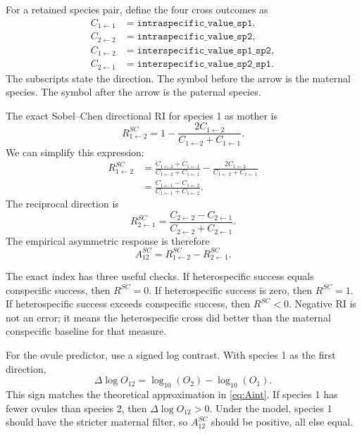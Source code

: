 \documentclass[12pt]{article}
\begin{document}
For a retained species pair, define the four cross outcomes as
\begin{align}
C_{1\leftarrow 1} &= \texttt{intraspecific\_value\_sp1},\\
C_{2\leftarrow 2} &= \texttt{intraspecific\_value\_sp2},\\
C_{1\leftarrow 2} &= \texttt{interspecific\_value\_sp1\_sp2},\\
C_{2\leftarrow 1} &= \texttt{interspecific\_value\_sp2\_sp1}.
\end{align}
The subscripts state the direction. The symbol before the arrow is the maternal species. The symbol after the arrow is the paternal species.

The exact Sobel--Chen directional RI for species 1 as mother is
\begin{equation}
R^{SC}_{1\leftarrow 2}
=1-\frac{2C_{1\leftarrow 2}}{C_{1\leftarrow 2}+C_{1\leftarrow 1}}.
\label{eq:SCdata1}
\end{equation}
We can simplify this expression:
\begin{align}
R^{SC}_{1\leftarrow 2}
&=\frac{C_{1\leftarrow 2}+C_{1\leftarrow 1}}{C_{1\leftarrow 2}+C_{1\leftarrow 1}}
-\frac{2C_{1\leftarrow 2}}{C_{1\leftarrow 2}+C_{1\leftarrow 1}}\\
&=\frac{C_{1\leftarrow 1}-C_{1\leftarrow 2}}{C_{1\leftarrow 1}+C_{1\leftarrow 2}}.
\label{eq:SCdata1simple}
\end{align}
The reciprocal direction is
\begin{equation}
R^{SC}_{2\leftarrow 1}
=\frac{C_{2\leftarrow 2}-C_{2\leftarrow 1}}{C_{2\leftarrow 2}+C_{2\leftarrow 1}}.
\label{eq:SCdata2simple}
\end{equation}
The empirical asymmetric response is therefore
\begin{equation}
A^{SC}_{12}=R^{SC}_{1\leftarrow 2}-R^{SC}_{2\leftarrow 1}.
\label{eq:SCasymdata}
\end{equation}

\begin{rulebox}
The exact index has three useful checks. If heterospecific success equals conspecific success, then $R^{SC}=0$. If heterospecific success is zero, then $R^{SC}=1$. If heterospecific success exceeds conspecific success, then $R^{SC}<0$. Negative RI is not an error; it means the heterospecific cross did better than the maternal conspecific baseline for that measure.
\end{rulebox}

For the ovule predictor, use a signed log contrast. With species 1 as the first direction,
\begin{equation}
\Delta\log O_{12}=\log_{10}(O_2)-\log_{10}(O_1).
\label{eq:dlogOdata}
\end{equation}
This sign matches the theoretical approximation in \eqref{eq:Aint}. If species 1 has fewer ovules than species 2, then $\Delta\log O_{12}>0$. Under the model, species 1 should have the stricter maternal filter, so $A^{SC}_{12}$ should be positive, all else equal.
\end{document}
